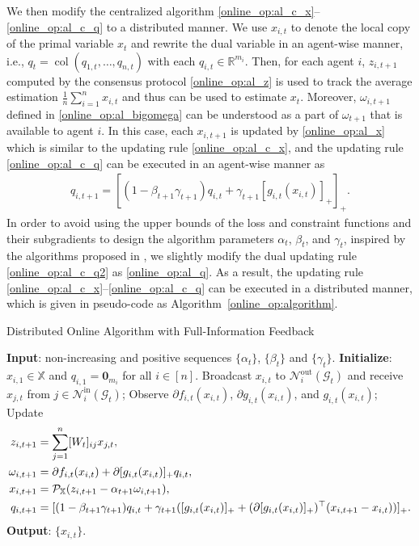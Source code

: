 \documentclass[12pt,draftcls,onecolumn]{IEEEtran}%
\DeclareMathOperator{\col}{col}
\DeclareMathOperator{\inout}{in}
\DeclareMathOperator{\outin}{out}
\begin{document}
We then modify the centralized algorithm \eqref{online_op:al_c_x}--\eqref{online_op:al_c_q} to a distributed manner. We use $x_{i,t}$ to denote the local copy of the primal variable $x_t$ and rewrite the dual variable in an agent-wise manner, i.e.,
$q_t=\col(q_{1,t},\dots,q_{n,t})$
with each $q_{i,t}\in\mathbb{R}^{m_i}$. Then, for each agent $i$, $z_{i,t+1}$ computed by the consensus protocol \eqref{online_op:al_z} is used to track the average estimation $\frac{1}{n}\sum_{i=1}^nx_{i,t}$ and thus can be used to estimate $x_{t}$. Moreover, $\omega_{i,t+1}$ defined in \eqref{online_op:al_bigomega} can be understood as a part of $\omega_{t+1}$ that is available to agent $i$. In this case,  each $x_{i,t+1}$ is updated by \eqref{online_op:al_x} which is similar to the updating rule \eqref{online_op:al_c_x}, and
the updating rule \eqref{online_op:al_c_q} can be executed in an agent-wise manner as
\begin{align}
	q_{i,t+1}=[(1-\beta_{t+1}\gamma_{t+1})q_{i,t}+\gamma_{t+1}[g_{i,t}(x_{i,t})]_+]_+.
	\label{online_op:al_c_q2}
\end{align}
In order to avoid using the upper bounds of the loss and constraint functions and their subgradients to design the algorithm parameters $\alpha_t$, $\beta_t$, and $\gamma_t$, inspired by the algorithms proposed in \cite{yu2017online,yi2020distributed,neely2017online}, we slightly modify the dual updating rule \eqref{online_op:al_c_q2} as \eqref{online_op:al_q}.
As a result, the updating rule \eqref{online_op:al_c_x}--\eqref{online_op:al_c_q}  can be executed in a distributed manner, which is given in pseudo-code as Algorithm~\ref{online_op:algorithm}.

\begin{algorithm}
	\caption{Distributed Online Algorithm with Full-Information Feedback}
	\begin{algorithmic}\label{online_op:algorithm}
		\STATE \textbf{Input}:   non-increasing and positive sequences $\{\alpha_t\}$, $\{\beta_t\}$ and $\{\gamma_t\}$.
		\STATE \textbf{Initialize}:  $x_{i,1}\in\mathbb{X}$ and $q_{i,1}={\bm 0}_{m_i}$ for all $i\in[n]$.
		\STATE  Broadcast $x_{i,t}$ to $\mathcal{N}^{\outin}_i(\mathcal{G}_{t})$ and receive $x_{j,t}$ from $j\in\mathcal{N}^{\inout}_i(\mathcal{G}_{t})$;
		\STATE  Observe $\partial f_{i,t}(x_{i,t})$, $\partial g_{i,t}(x_{i,t})$, and $g_{i,t}(x_{i,t})$;
		\STATE  Update \begin{align}
			z_{i,t+1}&=\sum_{j=1}^n[W_{t}]_{ij}x_{j,t},\label{online_op:al_z}\\
			\omega_{i,t+1}&=\partial f_{i,t}(x_{i,t})+\partial [g_{i,t}(x_{i,t})]_+ q_{i,t},\label{online_op:al_bigomega}\\
			x_{i,t+1}&={\mathcal{P}}_\mathbb{X}(z_{i,t+1}-\alpha_{t+1}\omega_{i,t+1}),\label{online_op:al_x}\\
			q_{i,t+1}&=[(1-\beta_{t+1}\gamma_{t+1})q_{i,t}+\gamma_{t+1}([g_{i,t}(x_{i,t})]_+
			+(\partial [g_{i,t}(x_{i,t})]_+)^\top(x_{i,t+1}-x_{i,t}))]_{+}.\label{online_op:al_q}
		\end{align}
		\ENDFOR
		\ENDFOR
		\STATE  \textbf{Output}: $\{x_{i,t}\}$.
	\end{algorithmic}
\end{algorithm}
\end{document}
